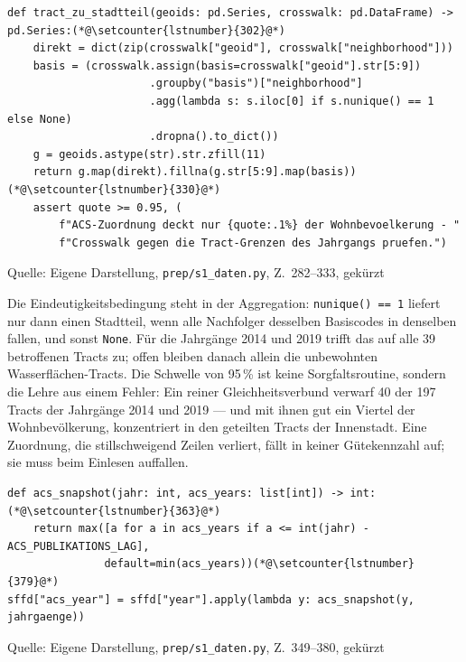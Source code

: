 \documentclass[12pt,a4paper]{article}
\newcommand{\tabquelle}[1][Eigene Darstellung]{%
  \par\setlength{\parskip}{0pt}\vspace{3pt}%
  {\setstretch{1}\fontsize{9pt}{11pt}\selectfont\raggedright Quelle: #1\par}%
}
\begin{document}
\begin{quellcode}[htbp]
\caption{Zuordnung über Zensusgrenzen hinweg}
\label{lst:crosswalk}\vspace{-3.5pt}
\begin{lstlisting}[style=pythonstil,firstnumber=282]
def tract_zu_stadtteil(geoids: pd.Series, crosswalk: pd.DataFrame) -> pd.Series:(*@\setcounter{lstnumber}{302}@*)
    direkt = dict(zip(crosswalk["geoid"], crosswalk["neighborhood"]))
    basis = (crosswalk.assign(basis=crosswalk["geoid"].str[5:9])
                      .groupby("basis")["neighborhood"]
                      .agg(lambda s: s.iloc[0] if s.nunique() == 1 else None)
                      .dropna().to_dict())
    g = geoids.astype(str).str.zfill(11)
    return g.map(direkt).fillna(g.str[5:9].map(basis))(*@\setcounter{lstnumber}{330}@*)
    assert quote >= 0.95, (
        f"ACS-Zuordnung deckt nur {quote:.1%} der Wohnbevoelkerung - "
        f"Crosswalk gegen die Tract-Grenzen des Jahrgangs pruefen.")
\end{lstlisting}
\tabquelle[Eigene Darstellung, \texttt{prep/s1\_daten.py}, Z.~282--333, gekürzt]
\end{quellcode}

Die Eindeutigkeitsbedingung steht in der Aggregation: \texttt{nunique() == 1}
liefert nur dann einen Stadtteil, wenn alle Nachfolger desselben Basiscodes in
denselben fallen, und sonst \texttt{None}. Für die Jahrgänge 2014 und 2019
trifft das auf alle 39 betroffenen Tracts zu; offen bleiben danach allein die
unbewohnten Wasserflächen-Tracts. Die Schwelle von 95\,\% ist keine
Sorgfaltsroutine, sondern die Lehre aus einem Fehler: Ein reiner
Gleichheitsverbund verwarf 40 der 197 Tracts der Jahrgänge 2014 und 2019 --- und
mit ihnen gut ein Viertel der Wohnbevölkerung, konzentriert in den geteilten
Tracts der Innenstadt. Eine Zuordnung, die stillschweigend Zeilen verliert,
fällt in keiner Gütekennzahl auf; sie muss beim Einlesen auffallen.
 
\begin{quellcode}[htbp]
\caption{Zeitbewusste Zuordnung des ACS-Jahrgangs}
\label{lst:acs-versatz}\vspace{-3.5pt}
\begin{lstlisting}[style=pythonstil,firstnumber=349]
def acs_snapshot(jahr: int, acs_years: list[int]) -> int:(*@\setcounter{lstnumber}{363}@*)
    return max([a for a in acs_years if a <= int(jahr) - ACS_PUBLIKATIONS_LAG],
               default=min(acs_years))(*@\setcounter{lstnumber}{379}@*)
sffd["acs_year"] = sffd["year"].apply(lambda y: acs_snapshot(y, jahrgaenge))
\end{lstlisting}
\tabquelle[Eigene Darstellung, \texttt{prep/s1\_daten.py}, Z.~349--380, gekürzt]
\end{quellcode}
 
\end{document}
